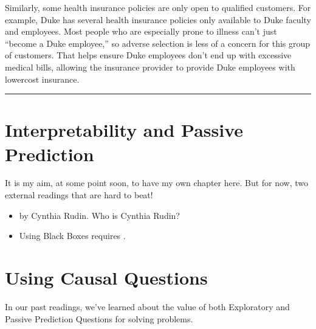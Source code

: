 \documentclass[letterpaper,10pt,english]{jupyterBook}
\begin{document}
\sphinxAtStartPar
Similarly, some health insurance policies are only open to qualified customers. For example, Duke has several health insurance policies only available to Duke faculty and employees. Most people who are especially prone to illness can’t just “become a Duke employee,” so adverse selection is less of a concern for this group of customers. That helps ensure Duke employees don’t end up with excessive medical bills, allowing the insurance provider to provide Duke employees with lower\sphinxhyphen{}cost insurance.


\bigskip\hrule\bigskip


\sphinxstepscope


\chapter{Interpretability and Passive Prediction}
\label{\detokenize{30_questions/32_passive_interpretable_models:interpretability-and-passive-prediction}}\label{\detokenize{30_questions/32_passive_interpretable_models::doc}}
\sphinxAtStartPar
It is my aim, at some point soon, to have my own chapter here. But for now, two external readings that are hard to beat!
\begin{itemize}
\item {} 
\sphinxAtStartPar
{} by Cynthia Rudin. Who is Cynthia Rudin? 

\item {} 
\sphinxAtStartPar
Using Black Boxes requires .

\end{itemize}



\sphinxstepscope


\chapter{Using Causal Questions}
\label{\detokenize{30_questions/35_using_causal_questions:using-causal-questions}}\label{\detokenize{30_questions/35_using_causal_questions::doc}}
\sphinxAtStartPar
In our past readings, we’ve learned about the value of both Exploratory and Passive Prediction Questions for solving problems.
\end{document}

